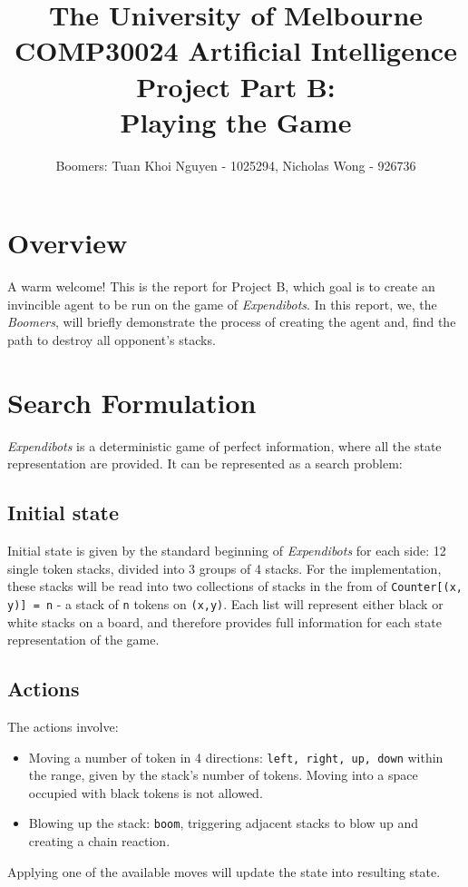 \documentclass[]{article}
\title{
{\small\sc
    The University of Melbourne\\
    COMP30024 Artificial Intelligence\\[1.5ex]
}
{\LARGE 
    Project Part B:\\[1ex]
}
{\Huge\bf
    Playing the Game
}
}
\author{Boomers: Tuan Khoi Nguyen - 1025294, Nicholas Wong - 926736}
\newcommand{\gameName}{Expendibots}
\begin{document}
\maketitle
 
\section*{Overview}

A warm welcome! This is the report for Project B, which goal is to create an invincible agent to be run on the game of \emph{\gameName}. In this report, we, the \emph{Boomers}, will briefly demonstrate the process of creating the agent and, find the path to destroy all opponent's stacks.

\section{Search Formulation}

\emph{\gameName} is a deterministic game of perfect information, where all the state representation are provided. It can be represented as a search problem:

\subsection{Initial state}

Initial state is given by the standard beginning of \emph{\gameName} for each side: 12 single token stacks, divided into 3 groups of 4 stacks. For the implementation, these stacks will be read into two collections of stacks in the from of \texttt{Counter[(x, y)] = n} - a stack of \texttt{n} tokens on \texttt{(x,y)}. Each list will represent either black or white stacks on a board, and therefore provides full information for each state representation of the game.

\subsection{Actions}
The actions involve:
\begin{itemize}
    \item Moving a number of token in 4 directions: \texttt{left, right, up, down} within the range, given by the stack's number of tokens. Moving into a space occupied with black tokens is not allowed.
    \item Blowing up the stack: \texttt{boom}, triggering adjacent stacks to blow up and creating a chain reaction.
\end{itemize}
Applying one of the available moves will update the state into resulting state.
\end{document}
